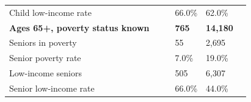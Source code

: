 \documentclass[9pt]{report}
\begin{document}
\begin{tabular}{p{.10in}p{.10in}p{.10in}p{3.7in}>{\hfill}p{.85in}>{\hfill}p{.85in}>{\hfill}p{.85in}>{\hfill}p{.85in}p{0.1in}}
\multicolumn{4}{l}{\parbox{3.6in}{\strut\raggedright{{Child low-income rate}}\strut}} &  &  & 66.0\% & 62.0\% & \multicolumn{1}{l}{}  \\ 
\multicolumn{4}{l}{\parbox{3.5in}{\strut\raggedright{\textbf{Ages 65+, poverty status known}\strut}}} & \textbf{} & \textbf{} & \textbf{765} & \textbf{14,180} & \textbf{} \\ 
\multicolumn{4}{l}{\parbox{3.6in}{\strut\raggedright{{Seniors in poverty}}\strut}} &  &  & 55 & 2,695 & \multicolumn{1}{l}{}  \\ 
\multicolumn{4}{l}{\parbox{3.6in}{\strut\raggedright{{Senior poverty rate}}\strut}} &  &  & 7.0\% & 19.0\% & \multicolumn{1}{l}{}  \\ 
\multicolumn{4}{l}{\parbox{3.6in}{\strut\raggedright{{Low-income seniors}}\strut}} &  &  & 505 & 6,307 & \multicolumn{1}{l}{}  \\ 
\multicolumn{4}{l}{\parbox{3.6in}{\strut\raggedright{{Senior low-income rate}}\strut}} &  &  & 66.0\% & 44.0\% & \multicolumn{1}{l}{}  \\ 

\end{tabular}
\setlength{\tabcolsep}{6pt} %
\end{document}
